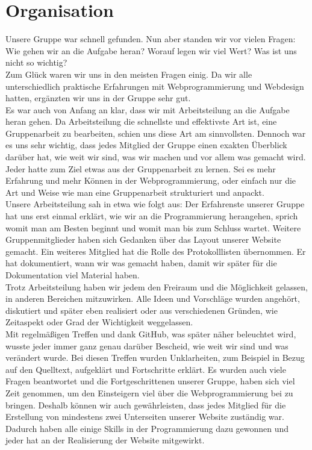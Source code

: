 \documentclass[12pt,a4paper]{article}
\begin{document}
\section{Organisation}
Unsere Gruppe war schnell gefunden. Nun aber standen wir vor vielen Fragen: Wie gehen wir an die Aufgabe heran? Worauf legen wir viel Wert? Was ist uns nicht so wichtig?\\ 
Zum Glück waren wir uns in den meisten Fragen einig. Da wir alle unterschiedlich praktische Erfahrungen mit Webprogrammierung und Webdesign hatten, ergänzten wir uns in der Gruppe sehr gut. \\
Es war auch von Anfang an klar, dass wir mit Arbeitsteilung an die Aufgabe heran gehen. Da Arbeitsteilung die schnellste und effektivste Art ist, eine Gruppenarbeit zu bearbeiten, schien uns diese Art am sinnvollsten. Dennoch war es uns sehr wichtig, dass jedes Mitglied der Gruppe einen exakten Überblick darüber hat, wie weit wir sind, was wir machen und vor allem was gemacht wird. Jeder hatte zum Ziel etwas aus der Gruppenarbeit zu lernen. Sei es mehr Erfahrung und mehr Können in der Webprogrammierung, oder einfach nur die Art und Weise wie man eine Gruppenarbeit strukturiert und anpackt. \\
Unsere Arbeitsteilung sah in etwa wie folgt aus: Der Erfahrenste unserer Gruppe hat uns erst einmal erklärt, wie wir an die Programmierung herangehen, sprich womit man am Besten beginnt und womit man bis zum Schluss wartet. Weitere Gruppenmitglieder haben sich Gedanken über das Layout unserer Website gemacht. Ein weiteres Mitglied hat die Rolle des Protokolllisten übernommen. Er hat dokumentiert, wann wir was gemacht haben, damit wir später für die Dokumentation viel Material haben. \\
Trotz Arbeitsteilung haben wir jedem den Freiraum und die Möglichkeit gelassen, in anderen Bereichen mitzuwirken. Alle Ideen und Vorschläge wurden angehört, diskutiert und später eben realisiert oder aus verschiedenen Gründen, wie Zeitaspekt oder Grad der Wichtigkeit weggelassen. \\
Mit regelmäßigen Treffen und dank GitHub, was später näher beleuchtet wird, wusste jeder immer ganz genau darüber Bescheid, wie weit wir sind und was verändert wurde. Bei diesen Treffen wurden Unklarheiten, zum Beispiel in Bezug auf den Quelltext, aufgeklärt und Fortschritte erklärt. Es wurden auch viele Fragen beantwortet und die Fortgeschrittenen unserer Gruppe, haben sich viel Zeit genommen, um den Einsteigern viel über die Webprogrammierung bei zu bringen. Deshalb können wir auch gewährleisten, dass jedes Mitglied für die Erstellung von mindestens zwei Unterseiten unserer Website zuständig war. Dadurch haben alle einige Skills in der Programmierung dazu gewonnen und jeder hat an der Realisierung der Website mitgewirkt.\\
\end{document}
